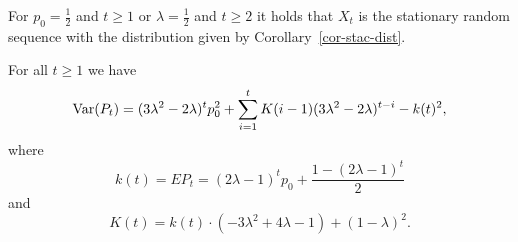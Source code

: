 \begin{remark}
For $p_0=\frac{1}{2}$ and $t\ge1$ or $\lambda = \frac{1}{2}$ and $t\ge2$ it holds that $X_t$ is the stationary
random sequence with the distribution given by
Corollary~\ref{cor-stac-dist}.
\end{remark}

\begin{proposition}
\label{PropVarP-succes}For all $t\geq1$ we have
\begin{equation}
\mathop{\rm Var}(P_{t})=(3\lambda^{2}-2\lambda)^{t}p_{0}^{2}+\sum_{i=1}^{t}K(i-1)(3\lambda^{2}-2\lambda)^{t-i}-k(t)^{2},\label{eq:VarP-proposition}
\end{equation}
where
\[
k(t)=EP_{t}=(2\lambda-1)^{t}p_{0}+\frac{1-(2\lambda-1)^{t}}{2}
\]
and
\[
K(t)=k(t)\cdot(-3\lambda^{2}+4\lambda-1)+(1-\lambda)^{2}.
\]
\end{proposition}

